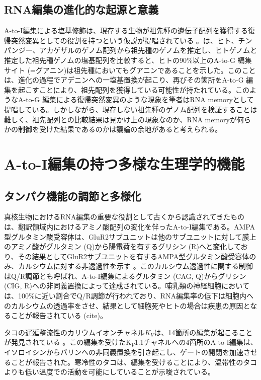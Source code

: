 \subsection{RNA編集の進化的な起源と意義}
A-to-I編集による塩基修飾は、現存する生物が祖先種の遺伝子配列を獲得する復帰突然変異としての役割を持つという仮説が提唱されている \citep{Che1307, Pinto:2014aa}。\cite{Che1307}は、ヒト、チンパンジー、アカゲザルのゲノム配列から祖先種のゲノムを推定し、ヒトゲノムと推定した祖先種ゲノムの塩基配列を比較すると、ヒトの90\%以上のA-to-G 編集サイト (=グアニン)は祖先種においてもグアニンであることを示した。このことは、進化の過程でアデニンへの一塩基置換が起こり、再びその箇所をA-to-G 編集を起こすことにより、祖先配列を獲得している可能性が持たれている。このようなA-to-G 編集による復帰突然変異のような現象を筆者はRNA memoryとして提唱している。しかしながら、現存しない祖先種のゲノム配列を検証することは難しく、祖先配列との比較結果は見かけ上の現象なのか、RNA memoryが何らかの制御を受けた結果であるのかは議論の余地があると考えられる。

\section{A-to-I編集の持つ多様な生理学的機能}
\subsection{タンパク機能の調節と多様化}
真核生物におけるRNA編集の重要な役割として古くから認識されてきたものは、翻訳領域内におけるアミノ酸配列の変化を伴ったA-to-I編集である。AMPA型グルタミン酸受容体は、GluR2サブユニットは他のサブユニットに対して膜上のアミノ酸がグルタミン (Q)から陽電荷を有するグリシン (R)へと変化しており、その結果としてGluR2サブユニットを有するAMPA型グルタミン酸受容体のみ、カルシウムに対する非透過性を示す \citep{HigSinKoh9312}。このカルシウム透過性に関する制御はQ/R調節とも呼ばれ、A-to-I編集によるグルタミン (CAG, Q)からグリシン (CIG, R)への非同義置換によって達成されている。哺乳類の神経細胞においては、100\%に近い割合でQ/R調節が行われており、RNA編集率の低下は細胞内へのカルシウムの透過率をさせ、結果として細胞死やヒトの場合は疾患の原因となることが報告されている (cite)。
\par
タコの遅延整流性のカリウムイオンチャネル$K_{V}$は、14箇所の編集が起こることが発見されている \citep{Garrett:2012aa}。この編集を受けたK$_{V}$1.1チャネルへの4箇所のA-to-I編集は、イソロイシンからバリンへの非同義置換を引き起こし、ゲートの開閉を加速させることが報告された。寒冷性のタコは、編集を受けることにより、温帯性のタコよりも低い温度での活動を可能にしていることが示唆されている。

